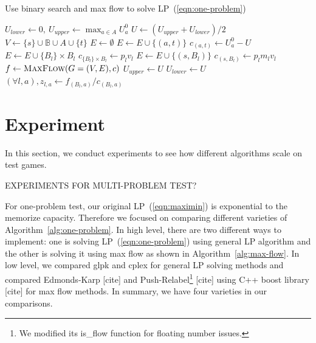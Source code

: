 \documentclass{article}
\begin{document}
\begin{algorithm}
\caption{Use binary search and max flow to solve LP~(\ref{eqn:one-problem})}
\label{alg:max-flow}
\begin{algorithmic}[1]
	\State $U_{lower} \gets 0, ~U_{upper} \gets \max_{a \in A} U^0_a$
		\State $U \gets (U_{upper}+U_{lower})/2$ 
		\State $V \gets \{s\} \cup \mathbb B \cup A \cup \{t\}$ 
		\State $E \gets \emptyset$ 
				\State $E \gets E \cup \{(a, t)\}$
				\State $c_{(a, t)} \gets U^0_a-U$ 
			\EndIf
		\EndFor
			\State $E \gets E \cup \{B_l\} \times B_l$ %
			\State $c_{\{B_l\} \times B_l} \gets p_l v_l$ 
			\State $E \gets E \cup \{(s, B_l)\}$ %
			\State $c_{(s, B_l)} \gets p_l m_l v_l$
		\EndFor
		\State $f \gets \Call{MaxFlow}{G = (V, E), c}$
			\State $U_{upper} \gets U$
		\Else
			\State $U_{lower} \gets U$
		\EndIf
	\EndWhile
	\State $(\forall l, a), z_{l,a} \gets f_{(B_l,a)} / c_{(B_l, a)}$
	\State {}
\end{algorithmic}
\end{algorithm}

\section{Experiment}

In this section, we conduct experiments to see how different algorithms scale
on test games. 

EXPERIMENTS FOR MULTI-PROBLEM TEST?

For one-problem test, our original LP~(\ref{eqn:maximin}) is exponential to the
memorize capacity. Therefore we focused on comparing different varieties of
Algorithm~\ref{alg:one-problem}. In high level, there are two different
ways to implement: one is solving LP~(\ref{eqn:one-problem}) using general LP
algorithm and the other is solving it using max flow as shown in
Algorithm~\ref{alg:max-flow}. In low level, we compared glpk and cplex for
general LP solving methods and compared Edmonds-Karp [cite] and
Push-Relabel\footnote{We modified its is\_flow function for floating number
issues.} [cite] using C++ boost library [cite] for max flow methods.  In
summary, we have four varieties in our comparisons.
\end{document}
